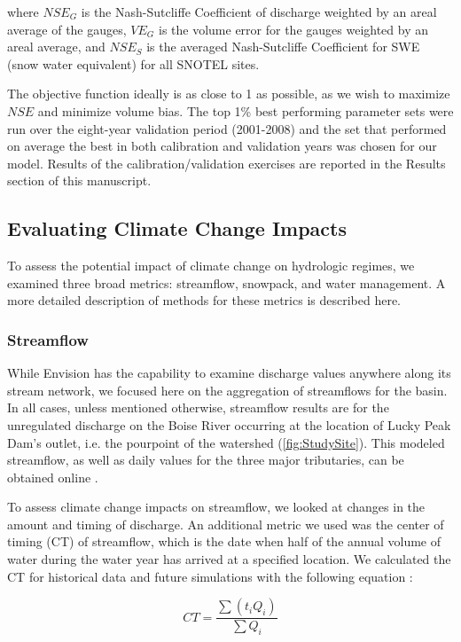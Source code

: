 \documentclass[water,article,submit,moreauthors,pdftex,10pt,a4paper]{mdpi}
\theoremstyle{mdpi}
\newcounter{ex}
\newcounter{re}
\theoremstyle{mdpidefinition}
\begin{document}
where $NSE_G$ is the Nash-Sutcliffe Coefficient of discharge weighted by an areal average of the gauges, $VE_G$  is the volume error for the gauges weighted by an areal average, and $NSE_S$ is the averaged Nash-Sutcliffe Coefficient for SWE (snow water equivalent) for all SNOTEL sites. 

The objective function ideally is as close to 1 as possible, as we wish to maximize $NSE$ and minimize volume bias. The top 1\% best performing parameter sets were run over the eight-year validation period (2001-2008) and the set that performed on average the best in both calibration and validation years was chosen for our model. Results of the calibration/validation exercises are reported in the Results section of this manuscript.

\subsection{Evaluating Climate Change Impacts}

To assess the potential impact of climate change on hydrologic regimes, we examined three broad metrics: streamflow, snowpack, and water management. A more detailed description of methods for these metrics is described here.

\subsubsection{Streamflow}
While Envision has the capability to examine discharge values anywhere along its stream network, we focused here on the aggregation of streamflows for the basin. In all cases, unless mentioned otherwise, streamflow results are for the unregulated discharge on the Boise River occurring at the location of Lucky Peak Dam's outlet, i.e. the pourpoint of the watershed (\cref{fig:StudySite}). This modeled streamflow, as well as daily values for the three major tributaries, can be obtained online \citep{Steimke:2017hb}. 

To assess climate change impacts on streamflow, we looked at changes in the amount and timing of discharge. An additional metric we used was the center of timing (CT) of streamflow, which is the date when half of the annual volume of water during the water year has arrived at a specified location. We calculated the CT for historical data and future simulations with the following equation \citep{Stewart:2005ed}: 

\begin{equation}
CT = \frac{\sum \left(t_iQ_i\right)}{\sum Q_i}
\end{equation}
\end{document}
